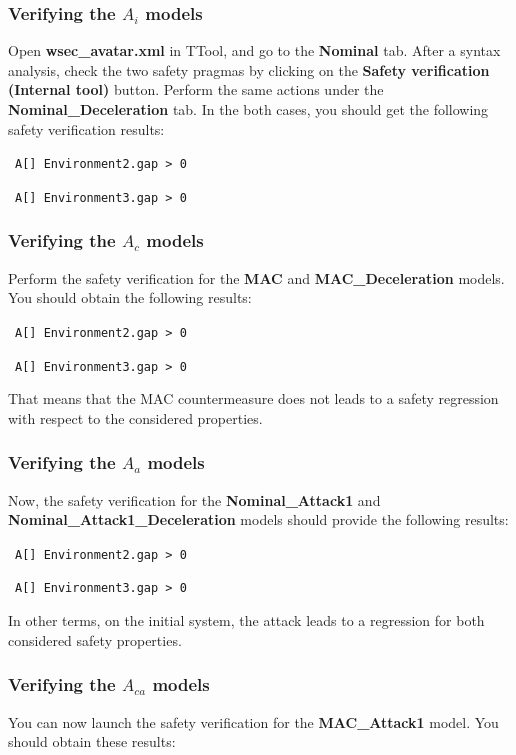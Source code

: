 \documentclass{article}
\newcommand{\cmark}{\textcolor{green}{\textbf{\ding{51}}}}
\newcommand{\xmark}{\textcolor{red}{\textbf{\ding{55}}}}
\begin{document}
\subsubsection{Verifying the $A_i$ models}

Open \textbf{wsec\_avatar.xml} in TTool, and go to the \textbf{Nominal} tab. After a syntax analysis, check the two safety pragmas by clicking on the \textbf{Safety verification (Internal tool)} button. Perform the same actions under the \textbf{Nominal\_Deceleration} tab. In the both cases, you should get the following safety verification results:

\cmark~\verb|A[] Environment2.gap > 0|

\cmark~\verb|A[] Environment3.gap > 0|


\subsubsection{Verifying the $A_c$ models}

Perform the safety verification for the \textbf{MAC} and \textbf{MAC\_Deceleration} models. You should obtain the following results:

\cmark~\verb|A[] Environment2.gap > 0|

\cmark~\verb|A[] Environment3.gap > 0|

That means that the MAC countermeasure does not leads to a safety regression with respect to the considered properties.


\subsubsection{Verifying the $A_a$ models}

Now, the safety verification for the \textbf{Nominal\_Attack1} and \textbf{Nominal\_Attack1\_Deceleration} models should provide the following results:

\xmark~\verb|A[] Environment2.gap > 0|

\xmark~\verb|A[] Environment3.gap > 0|

In other terms, on the initial system, the attack leads to a regression for both considered safety properties.

\subsubsection{Verifying the $A_{c a}$ models}

You can now launch the safety verification for the \textbf{MAC\_Attack1} model. You should obtain these results:
\end{document}
